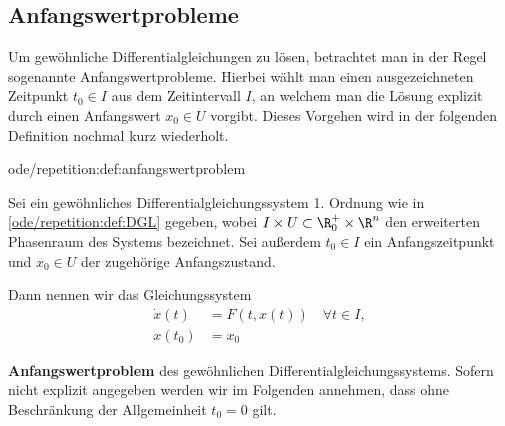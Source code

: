 \documentclass[letterpaper,10pt,english]{jupyterBook}
\begin{document}
\subsection{Anfangswertprobleme}
\label{\detokenize{ode/repetition:anfangswertprobleme}}
\par
Um gewöhnliche Differentialgleichungen zu lösen, betrachtet man in der Regel sogenannte Anfangswertprobleme.
Hierbei wählt man einen ausgezeichneten Zeitpunkt \(t_0\in I\) aus dem Zeitintervall \(I\), an welchem man die Lösung explizit durch einen Anfangswert \(x_0\in U\) vorgibt.
Dieses Vorgehen wird in der folgenden Definition nochmal kurz wiederholt.
\begin{definition}{}{ode/repetition:def:anfangswertproblem}



\par
Sei ein gewöhnliches Differentialgleichungssystem 1. Ordnung wie in \cref{ode/repetition:def:DGL} gegeben, wobei \(I \times U \subset \R_0^+ \times \R^n\) den erweiterten Phasenraum des Systems bezeichnet.
Sei außerdem \(t_0 \in I\) ein Anfangszeitpunkt und \(x_0 \in U\) der zugehörige Anfangszustand.

\par
Dann nennen wir das Gleichungssystem
\begin{align}\label{equation:ode/repetition:eq:AWP}
\dot{x}(t) &= F(t, x(t))\quad\forall t\in I, \\
x(t_0) &= x_0
\end{align}
\par
\textbf{Anfangswertproblem} des gewöhnlichen Differentialgleichungssystems.
Sofern nicht explizit angegeben werden wir im Folgenden annehmen, dass ohne Beschränkung der Allgemeinheit \(t_0=0\) gilt.
\end{definition}
\end{document}
